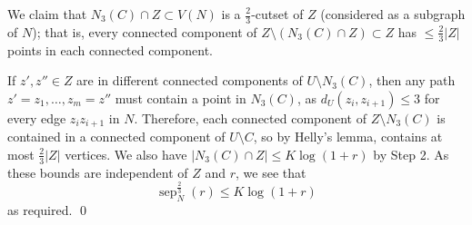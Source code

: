 \documentclass[11pt]{amsart}
\numberwithin{equation}{section}
\theoremstyle{citing}
\DeclareMathOperator{\sep}{sep}
\numberwithin{equation}{section}
\begin{document}
We claim that $N_3(C)\cap Z \subset V(N)$ is a $\frac23$-cutset of $Z$ (considered as a subgraph of $N$); that is, every connected component of $Z \setminus (N_3(C)\cap Z) \subset Z$ has $\leq \frac{2}{3}|Z|$ points in each connected component.

If $z',z''\in Z$ are in different connected components of $U\setminus N_3(C)$, then any path $z'=z_1,\ldots,z_m=z''$ must contain a point in $N_3(C)$, as $d_U(z_i,z_{i+1})\leq 3$ for every edge $z_iz_{i+1}$ in $N$. Therefore, each connected component of $Z\setminus N_3(C)$ is contained in a connected component of $U\setminus C$, so by Helly's lemma, contains at most $\frac23|Z|$ vertices. We also have $|N_3(C)\cap Z|\leq K\log(1+r)$ by Step 2. As these bounds are independent of $Z$ and $r$, we see that
\[
	\sep^{\frac23}_N(r) \leq K\log(1+r)
\]
as required. \qed




\end{document}
